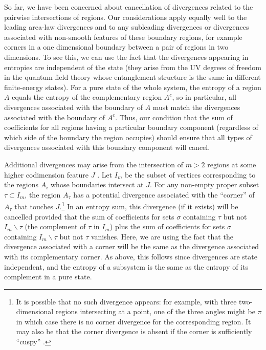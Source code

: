 \documentclass[10pt,a4paper]{amsart}
\theoremstyle{definition}
\begin{document}
So far, we have been concerned about cancellation of divergences related to the pairwise intersections of regions. Our considerations apply equally well to the leading area-law divergences and to any subleading divergences or divergences associated with non-smooth features of these boundary regions, for example corners in a one dimensional boundary between a pair of regions in two dimensions. To see this, we can use the fact that the divergences appearing in entropies are independent of the state (they arise from the UV degrees of freedom in the quantum field theory whose entanglement structure is the same in different finite-energy states). For a pure state of the whole system, the entropy of a region $A$ equals the entropy of the complementary region $A^c$, so in particular, all divergences associated with the boundary of $A$ must match the divergences associated with the boundary of $A^c$. Thus, our condition that the sum of coefficients for all regions having a particular boundary component (regardless of which side of the boundary the region occupies) should ensure that all types of divergences associated with this boundary component will cancel. 

Additional divergences may arise from the intersection of $m>2$ regions at some higher codimension feature $J$ \cite{CasiniHuerta2007_Universal2p1,CasiniHuerta2009_Review,BuenoMyersWitczak2015_PRL,BuenoMyers2015_JHEP,BuenoMyersWitczak2015_Twist,KallinEtAl2014_JStatMech,StoudenmireEtAl2014_PRB,HaywardSierensEtAl2017_TrihedralPRB,BednikEtAl2019_TrihedralPRB,SeminaraSistiTonni2017_BCFT,Berthiere2019_BoundaryCornerPRB,Nishioka2018_RMP}. Let $I_m$ be the subset of vertices corresponding to the regions $A_i$ whose boundaries intersect at $J$. For any non-empty proper subset $\tau \subset I_m$, the region $A_\tau$ has a potential divergence associated with the ``corner'' of $A_\tau$ that touches $J$.\footnote{It is possible that no such divergence appears: for example, with three two-dimensional regions intersecting at a point, one of the three angles might be $\pi$ in which case there is no corner divergence for the corresponding region. It may also be that the corner divergence is absent if the corner is sufficiently ``cuspy'' \cite{BuenoCasiniWitczak2019_SingularJHEP}.} In an entropy sum, this divergence (if it exists) will be cancelled provided that the sum of coefficients for sets $\sigma$ containing $\tau$ but not $I_m \backslash \tau$ (the complement of $\tau$ in $I_m$) plus the sum of coefficients for sets $\sigma$ containing $I_m \backslash \tau$ but not $\tau$ vanishes. Here, we are using the fact that the divergence associated with a corner will be the same as the divergence associated with its complementary corner. As above, this follows since divergences are state independent, and the entropy of a subsystem is the same as the entropy of its complement in a pure state. 
\end{document}
